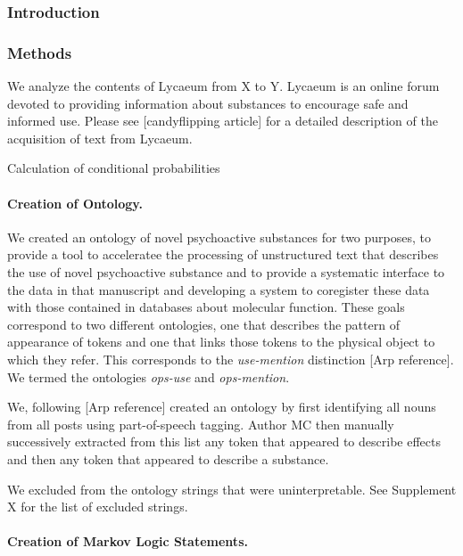 \documentclass[
]{article}
\date{}
\begin{document}
\hypertarget{header-n0}{%
\subsubsection{\texorpdfstring{Introduction
}{Introduction }}\label{header-n0}}

\hypertarget{header-n3}{%
\subsubsection{Methods}\label{header-n3}}

We analyze the contents of Lycaeum from X to Y. Lycaeum is an online
forum devoted to providing information about substances to encourage
safe and informed use. Please see {[}candyflipping article{]} for a
detailed description of the acquisition of text from Lycaeum.

Calculation of conditional probabilities

\hypertarget{header-n7}{%
\paragraph{Creation of Ontology.}\label{header-n7}}

We created an ontology of novel psychoactive substances for two
purposes, to provide a tool to acceleratee the processing of
unstructured text that describes the use of novel psychoactive substance
and to provide a systematic interface to the data in that manuscript and
developing a system to coregister these data with those contained in
databases about molecular function. These goals correspond to two
different ontologies, one that describes the pattern of appearance of
tokens and one that links those tokens to the physical object to which
they refer. This corresponds to the \emph{use-mention} distinction
{[}Arp reference{]}. We termed the ontologies \emph{ops-use} and
\emph{ops-mention}.

We, following {[}Arp reference{]} created an ontology by first
identifying all nouns from all posts using part-of-speech tagging.
Author MC then manually successively extracted from this list any token
that appeared to describe effects and then any token that appeared to
describe a substance.

We excluded from the ontology strings that were uninterpretable. See
Supplement X for the list of excluded strings.

\hypertarget{header-n12}{%
\paragraph{Creation of Markov Logic Statements.}\label{header-n12}}
\end{document}
